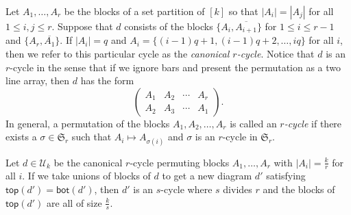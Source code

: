 \documentclass[ALCO,Unicode]{cedram}
\newcommand{\defncolor}{\color{darkred}}
\newcommand{\defn}[1]{{\defncolor\emph{#1}}} %
\begin{document}
Let $A_1, \ldots, A_r$ be the blocks of a set partition of $[k]$ so that $|A_i| = |A_j|$ for all $1\leqslant i, j\leqslant r$. Suppose that $d$ consists of
the blocks $\{A_i, \overline{A_{i+1}}\}$ for $1\leqslant i \leqslant r-1$ and $\{A_r, \overline{A_1}\}$. If $|A_i|=q$ and $A_i =\{(i-1)q +1, (i-1)q +2,\ldots, iq\}$ 
for all $i$, then we refer to this particular cycle as the \defn{canonical $r$-cycle}.  Notice that $d$ is an $r$-cycle in the sense that if we
ignore bars and present the permutation as a two line array, then $d$ has the form
\[
    \left( \begin{array}{cccc}
    A_1 & A_2 & \cdots & A_r\\
    A_2 & A_3 & \cdots & A_1
    \end{array}\right).
\]
In general, a permutation of the blocks $A_1, A_2, \ldots, A_r$ is called an
\defn{$r$-cycle} if there exists a $\sigma\in \mathfrak{S}_r$ such that $A_i \mapsto A_{\sigma(i)}$ and $\sigma$ is an $r$-cycle in $\mathfrak{S}_r$.

\begin{lemma}
\label{lem:onecycle}
Let $d\in \mathcal{U}_k$ be the canonical $r$-cycle permuting blocks $A_1, \ldots, A_r$ with $|A_i| = \frac{k}{r}$ for all $i$.
If we take unions of blocks of $d$ to get a new diagram $d'$ satisfying $\mathsf{top}(d') = \mathsf{bot}(d')$, then $d'$ is an $s$-cycle where $s$
divides $r$ and the blocks of $\mathsf{top}(d')$ are all of size $\frac{k}{s}$.
\end{lemma}
\end{document}
